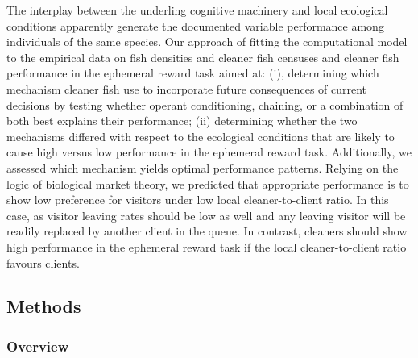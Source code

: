 \documentclass[]{rsos}%
\begin{document}
The interplay between the underling cognitive machinery and
local ecological conditions apparently generate the documented variable
performance among individuals of the same species.
Our approach of fitting the computational model to the empirical data on
fish densities and cleaner fish censuses and cleaner fish performance
in the ephemeral reward task aimed at: (i), determining which
mechanism cleaner fish use to incorporate future consequences of current
decisions by testing whether operant conditioning, chaining, or a combination
of both best explains their performance; (ii) determining whether the
two mechanisms differed with respect to the ecological conditions
that are likely to cause high versus low performance in the
ephemeral reward task. Additionally, we assessed which mechanism
yields optimal performance patterns. Relying on the logic of
biological market theory, we predicted
that appropriate performance is to show low preference for visitors under low
local cleaner-to-client ratio. In this case, as visitor leaving rates
should be low as well and any leaving visitor will be readily
replaced by another client in the queue. In contrast,
cleaners should show high performance in the ephemeral reward task
if the local cleaner-to-client ratio favours clients.

\hypertarget{methods}{%
\subsection{Methods}\label{methods}}

\hypertarget{overview}{%
\subsubsection{Overview}\label{overview}}
\end{document}
